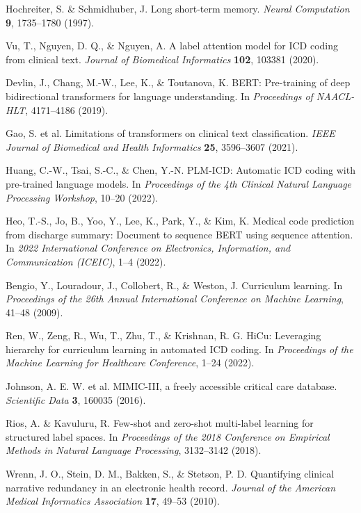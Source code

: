 \documentclass[12pt,a4paper]{report}
\begin{document}
\begin{thebibliography}{99}
Hochreiter, S. \& Schmidhuber, J. Long short-term memory. \textit{Neural Computation} \textbf{9}, 1735–1780 (1997).

Vu, T., Nguyen, D. Q., \& Nguyen, A. A label attention model for ICD coding from clinical text. \textit{Journal of Biomedical Informatics} \textbf{102}, 103381 (2020).

Devlin, J., Chang, M.-W., Lee, K., \& Toutanova, K. BERT: Pre-training of deep bidirectional transformers for language understanding. In \textit{Proceedings of NAACL-HLT}, 4171–4186 (2019).

Gao, S. et al. Limitations of transformers on clinical text classification. \textit{IEEE Journal of Biomedical and Health Informatics} \textbf{25}, 3596–3607 (2021).

Huang, C.-W., Tsai, S.-C., \& Chen, Y.-N. PLM-ICD: Automatic ICD coding with pre-trained language models. In \textit{Proceedings of the 4th Clinical Natural Language Processing Workshop}, 10–20 (2022).

Heo, T.-S., Jo, B., Yoo, Y., Lee, K., Park, Y., \& Kim, K. Medical code prediction from discharge summary: Document to sequence BERT using sequence attention. In \textit{2022 International Conference on Electronics, Information, and Communication (ICEIC)}, 1–4 (2022).

Bengio, Y., Louradour, J., Collobert, R., \& Weston, J. Curriculum learning. In \textit{Proceedings of the 26th Annual International Conference on Machine Learning}, 41–48 (2009).

Ren, W., Zeng, R., Wu, T., Zhu, T., \& Krishnan, R. G. HiCu: Leveraging hierarchy for curriculum learning in automated ICD coding. In \textit{Proceedings of the Machine Learning for Healthcare Conference}, 1–24 (2022).

Johnson, A. E. W. et al. MIMIC-III, a freely accessible critical care database. \textit{Scientific Data} \textbf{3}, 160035 (2016).

Rios, A. \& Kavuluru, R. Few-shot and zero-shot multi-label learning for structured label spaces. In \textit{Proceedings of the 2018 Conference on Empirical Methods in Natural Language Processing}, 3132–3142 (2018).

Wrenn, J. O., Stein, D. M., Bakken, S., \& Stetson, P. D. Quantifying clinical narrative redundancy in an electronic health record. \textit{Journal of the American Medical Informatics Association} \textbf{17}, 49–53 (2010).


\end{thebibliography}
\end{document}
